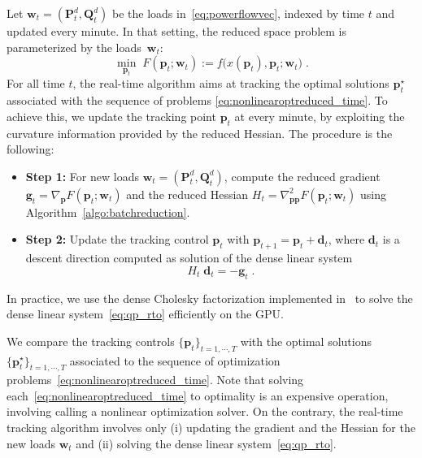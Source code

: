 Let $\bm{w}_t = (\bm{P}^d_t, \bm{Q}_t^d)$ be the loads
in~\eqref{eq:powerflowvec}, indexed by time $t$ and updated every minute.
In that setting, the reduced space problem is parameterized by the loads~$\bm{w}_t$:
\begin{equation}
  \label{eq:nonlinearoptreduced_time}
  \min_{\bm{p}_t} \; F(\bm p_t; \bm w_t) := f\big(x(\bm{p}_t), \bm{p}_t; \bm{w}_t\big) \; .
\end{equation}
For all time $t$, the real-time algorithm aims at tracking the optimal solutions $\bm{p}_t^\star$
associated with the sequence of problems \eqref{eq:nonlinearoptreduced_time}. To achieve this,
we update the tracking point $\bm{p}_t$
at every minute, by exploiting the curvature information provided by the reduced Hessian. The procedure is the following:
\begin{itemize}
  \item \textbf{Step 1:} For new loads $\bm{w}_t = (\bm{P}_t^d, \bm{Q}_t^d)$, compute
    the reduced gradient $\bm{g}_t = \nabla_{\bm{p}} F(\bm{p}_t; \bm{w}_t)$
    and the reduced Hessian $H_t = \nabla^2_{\bm{p}\bm{p}} F(\bm{p}_t; \bm{w}_t)$
    using Algorithm~\ref{algo:batchreduction}.
  \item \textbf{Step 2:} Update the tracking control $\bm{p}_t$ with
    $\bm{p}_{t+1} = \bm{p}_t + \bm{d}_t$, where $\bm{d}_t$
    is a descent direction computed as solution of the dense linear system
    \begin{equation}
      \label{eq:qp_rto}
      H_t \; \bm{d}_t = - \bm{g}_t \; .
    \end{equation}
\end{itemize}
In practice, we use the dense Cholesky factorization implemented in \cusolver\
to solve the dense linear system~\eqref{eq:qp_rto} efficiently on the GPU.

We compare the tracking controls $\{\bm{p}_t\}_{t=1,\cdots,T}$ with the optimal solutions
$\{\bm{p}_t^\star\}_{t=1,\cdots,T}$ associated to the sequence of optimization problems~\eqref{eq:nonlinearoptreduced_time}.
Note that solving each~\eqref{eq:nonlinearoptreduced_time} to optimality is an expensive operation, involving
calling a nonlinear optimization solver. On the contrary, the real-time tracking algorithm
involves only (i) updating the gradient and the Hessian for the new loads $\bm{w}_t$
and (ii) solving the dense linear system~\eqref{eq:qp_rto}.

